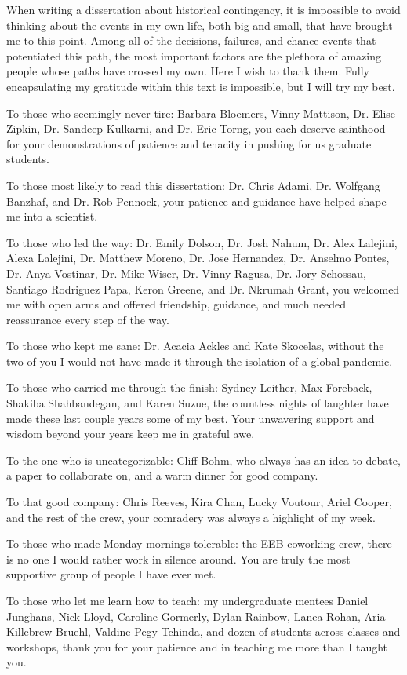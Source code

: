 When writing a dissertation about historical contingency, it is impossible to avoid thinking about the events in my own life, both big and small, that have brought me to this point. 
Among all of the decisions, failures, and chance events that potentiated this path, the most important factors are the plethora of amazing people whose paths have crossed my own.
Here I wish to thank them.
Fully encapsulating my gratitude within this text is impossible, but I will try my best. 

To those who seemingly never tire: Barbara Bloemers, Vinny Mattison, Dr. Elise Zipkin, Dr. Sandeep Kulkarni, and Dr. Eric Torng, you each deserve sainthood for your demonstrations of patience and tenacity in pushing for us graduate students. 

To those most likely to read this dissertation: Dr. Chris Adami, Dr. Wolfgang Banzhaf, and Dr. Rob Pennock, your patience and guidance have helped shape me into a scientist. 

To those who led the way: Dr. Emily Dolson, Dr. Josh Nahum, Dr. Alex Lalejini, Alexa Lalejini, Dr. Matthew Moreno, Dr. Jose Hernandez, Dr. Anselmo Pontes, Dr. Anya Vostinar, Dr. Mike Wiser, Dr. Vinny Ragusa, Dr. Jory Schossau, Santiago Rodriguez Papa, Keron Greene, and Dr. Nkrumah Grant, you  welcomed me with open arms and offered friendship, guidance, and much needed reassurance every step of the way. 

To those who kept me sane: Dr. Acacia Ackles and Kate Skocelas, without the two of you I would not have made it through the isolation of a global pandemic. 

To those who carried me through the finish: Sydney Leither, Max Foreback, Shakiba Shahbandegan, and Karen Suzue, the countless nights of laughter have made these last couple years some of my best. 
Your unwavering support and wisdom beyond your years keep me in grateful awe. 

To the one who is uncategorizable: Cliff Bohm, who always has an idea to debate, a paper to collaborate on, and a warm dinner for good company. 

To that good company: Chris Reeves, Kira Chan, Lucky Voutour, Ariel Cooper, and the rest of the crew, your comradery was always a highlight of my week. 

To those who made Monday mornings tolerable: the EEB coworking crew, there is no one I would rather work in silence around. You are truly the most supportive group of people I have ever met. 

To those who let me learn how to teach: my undergraduate mentees Daniel Junghans, Nick Lloyd, Caroline Gormerly, Dylan Rainbow, Lanea Rohan, Aria Killebrew-Bruehl, Valdine Pegy Tchinda, and dozen of students across classes and workshops, thank you for your patience and in teaching me more than I taught you. 

